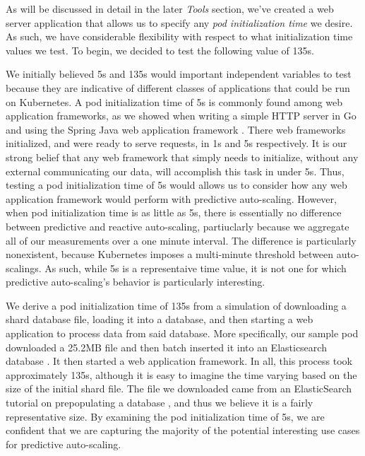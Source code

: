 As will be discussed in detail in the later \textit{Tools} section, we've created a web
server application that allows us to specify any \textit{pod
initialization time} we desire. As such, we have considerable flexibility with
respect to what initialization time values we test. To begin, we decided to test the
following value of 135s.

We initially believed 5s and 135s would important independent variables to test because they
are indicative of different classes of applications that could be run on
Kubernetes. A pod initialization time of 5s is commonly found among web
application frameworks, as we showed when writing a simple HTTP server in Go and
using the Spring Java web application framework \cite{spring}. There web
frameworks initialized, and were ready to serve requests, in 1s and 5s
respectively. It is our strong belief that any web framework that simply
needs to initialize, without any external communicating our data, will
accomplish this task in under 5s. Thus, testing a pod initialization time of 5s
would allows us to consider how any web application framework would perform with
predictive auto-scaling. However, when pod initialization time is as little as
5s, there is essentially no difference between predictive and reactive
auto-scaling, partiuclarly because we aggregate all of our measurements over a
one minute interval. The difference is particularly nonexistent, because
Kubernetes imposes a multi-minute threshold between auto-scalings.
As such, while 5s is a representaive time value, it is not
one for which predictive auto-scaling's behavior is particularly interesting.

We derive a pod initialization time of 135s from a simulation of downloading a
shard database file, loading it into a database, and then starting a web
application to process data from said database. More specifically, our sample
pod downloaded a 25.2MB file and then batch inserted it into an Elasticsearch
database \cite{elasticsearch}. It then started a web application framework. In
all, this process took approximately 135s, although it is easy to imagine the
time varying based on the size of the initial shard file. The file we downloaded
came from an ElasticSearch tutorial on prepopulating a database
\cite{elasticsearch-import-some-data}, and thus we believe it is a fairly
representative size. By examining the pod initialization time of 5s, we
are confident that we are capturing the majority of the potential interesting use cases for
predictive auto-scaling.

